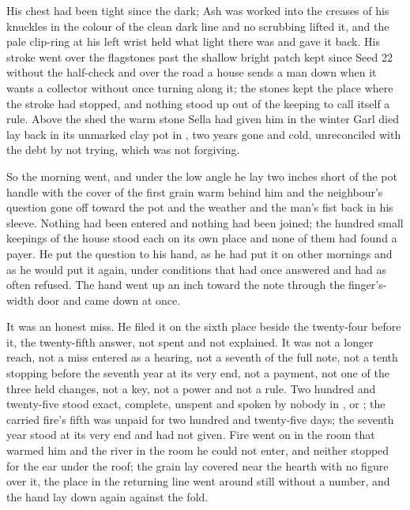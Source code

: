 His chest had been tight since the dark; Ash was worked into the creases of his knuckles in the colour of the clean dark line and no scrubbing lifted it, and the pale clip-ring at his left wrist held what light there was and gave it back. His stroke went over the flagstones past the shallow bright patch kept since Seed 22 without the half-check and over the road a house sends a man down when it wants a collector without once turning along it; the stones kept the place where the stroke had stopped, and nothing stood up out of the keeping to call itself a rule. Above the shed the warm stone Sella had given him in the winter Garl died lay back in its unmarked clay pot in , two years gone and cold, unreconciled with the debt by not trying, which was not forgiving.

\scenebreak

So the morning went, and under the low angle he lay two inches short of the pot handle with the cover of the first grain warm behind him and the neighbour's question gone off toward the pot and the weather and the man's fist back in his sleeve. Nothing had been entered and nothing had been joined; the hundred small keepings of the house stood each on its own place and none of them had found a payer. He put the question to his hand, as he had put it on other mornings and as he would put it again, under conditions that had once answered and had as often refused. The hand went up an inch toward the note through the finger's-width door and came down at once.

It was an honest miss. He filed it on the sixth place beside the twenty-four before it, the twenty-fifth answer, not spent and not explained. It was not a longer reach, not a miss entered as a hearing, not a seventh of the full note, not a tenth stopping before the seventh year at its very end, not a payment, not one of the three held changes, not a key, not a power and not a rule. Two hundred and twenty-five stood exact, complete, unspent and spoken by nobody in ,  or ; the carried fire's fifth was unpaid for two hundred and twenty-five days; the seventh year stood at its very end and had not given. Fire went on in the room that warmed him and the river in the room he could not enter, and neither stopped for the ear under the roof; the grain lay covered near the hearth with no figure over it, the place in the returning line went around still without a number, and the hand lay down again against the fold.
